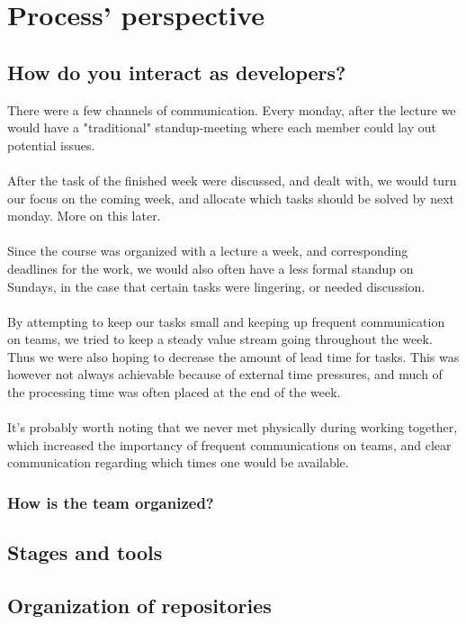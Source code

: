 \section{Process' perspective}
\subsection{How do you interact as developers?}
There were a few channels of communication. Every monday, after the lecture we would have a "traditional" standup-meeting where each member could lay out potential issues.
\\\\
After the task of the finished week were discussed, and dealt with, we would turn our focus on the coming week, and allocate which tasks should be solved by next monday. More on this later.
\\\\
Since the course was organized with a lecture a week, and corresponding deadlines for the work, we would also often have a less formal standup on Sundays, in the case that certain tasks were lingering, or needed discussion.
\\\\
By attempting to keep our tasks small and keeping up frequent communication on teams, we tried to keep a steady value stream going throughout the week. Thus we were also hoping to decrease the amount of lead time for tasks. This was however not always achievable because of external time pressures, and much of the processing time was often placed at the end of the week.
\\\\
It's probably worth noting that we never met physically during working together, which increased the importancy of frequent communications on teams, and clear communication regarding which times one would be available.
\subsubsection{How is the team organized?}
\subsection{Stages and tools}
\subsection{Organization of repositories}
